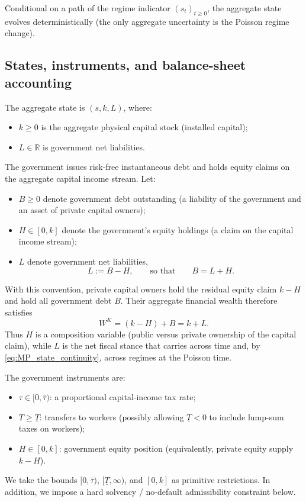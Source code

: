 \documentclass{article}
\begin{document}
Conditional on a path of the regime indicator $(s_t)_{t\ge 0}$, the aggregate state evolves deterministically (the only
aggregate uncertainty is the Poisson regime change).

\subsection{States, instruments, and balance-sheet accounting}

The aggregate state is $(s,k,L)$, where:
\begin{itemize}[leftmargin=2em]
\item $k\ge 0$ is the aggregate physical capital stock (installed capital);
\item $L\in \mathbb{R}$ is government net liabilities.
\end{itemize}

The government issues risk-free instantaneous debt and holds equity claims on the aggregate
capital income stream. Let:
\begin{itemize}[leftmargin=2em]
\item $B\ge 0$ denote government debt outstanding (a liability of the government and an asset
of private capital owners);
\item $H\in[0,k]$ denote the government's equity holdings (a claim on the capital income stream);
\item $L$ denote government net liabilities,
\begin{equation}
L := B - H,
\qquad\text{so that}\qquad
B = L + H.
\label{eq:MP_net_liabilities_def}
\end{equation}
\end{itemize}

With this convention, private capital owners hold the residual equity claim $k-H$ and hold
all government debt $B$. Their aggregate financial wealth therefore satisfies
\begin{equation}
W^K = (k-H)+B = k+L.
\label{eq:MP_owners_wealth}
\end{equation}
Thus $H$ is a composition variable (public versus private ownership of the capital claim),
while $L$ is the net fiscal stance that carries across time and, by \eqref{eq:MP_state_continuity},
across regimes at the Poisson time.

The government instruments are:
\begin{itemize}[leftmargin=2em]
\item $\tau\in[0,\bar\tau)$: a proportional capital-income tax rate;
\item $T\ge \underline T$: transfers to workers (possibly allowing $\underline T<0$ to include lump-sum
taxes on workers);
\item $H\in[0,k]$: government equity position (equivalently, private equity supply $k-H$).
\end{itemize}
We take the bounds $[0,\bar\tau)$, $[\underline T,\infty)$, and $[0,k]$ as primitive restrictions.
In addition, we impose a hard solvency / no-default admissibility constraint below.
\end{document}
